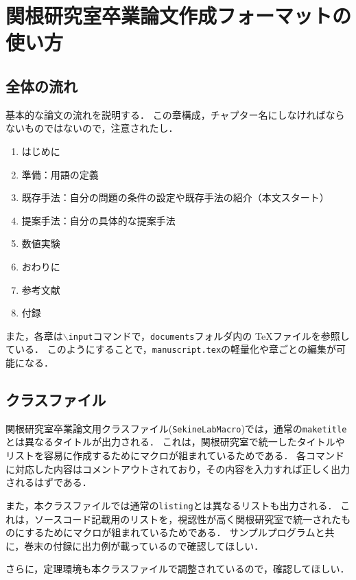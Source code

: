 \chapter{関根研究室卒業論文作成フォーマットの使い方}

\section{全体の流れ}
基本的な論文の流れを説明する．
この章構成，チャプター名にしなければならないものではないので，注意されたし．
\begin{enumerate}
    \item はじめに
    \item 準備：用語の定義
    \item 既存手法：自分の問題の条件の設定や既存手法の紹介（本文スタート）
    \item 提案手法：自分の具体的な提案手法
    \item 数値実験
    \item おわりに

    \item 参考文献
    \item 付録
\end{enumerate}
また，各章は\texttt{$\backslash$input}コマンドで，\texttt{documents}フォルダ内の \TeX ファイルを参照している．
このようにすることで，\texttt{manuscript.tex}の軽量化や章ごとの編集が可能になる．

\section{クラスファイル}
関根研究室卒業論文用クラスファイル(\texttt{SekineLabMacro})では，通常の\texttt{maketitle}とは異なるタイトルが出力される．
これは，関根研究室で統一したタイトルやリストを容易に作成するためにマクロが組まれているためである．
各コマンドに対応した内容はコメントアウトされており，その内容を入力すれば正しく出力されるはずである．

また，本クラスファイルでは通常の\texttt{listing}とは異なるリストも出力される．
これは，ソースコード記載用のリストを，視認性が高く関根研究室で統一されたものにするためにマクロが組まれているためである．
サンプルプログラムと共に，巻末の付録に出力例が載っているので確認してほしい．

さらに，定理環境も本クラスファイルで調整されているので，確認してほしい．

